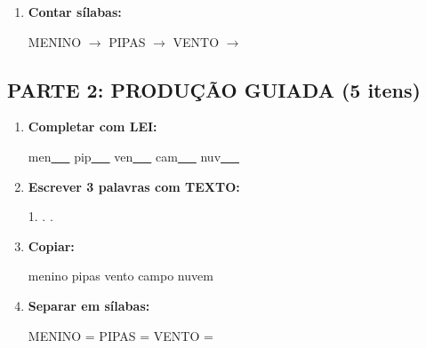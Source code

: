 \begin{exercicio}
\begin{enumerate}
  \item \textbf{Contar sílabas:}
  \begin{center}
  MENINO $\rightarrow$ \underline{\hspace{0.9cm}} \quad PIPAS $\rightarrow$ \underline{\hspace{0.9cm}} \quad VENTO $\rightarrow$ \underline{\hspace{0.9cm}}
  \end{center}

\end{enumerate}

\subsection*{PARTE 2: PRODUÇÃO GUIADA (5 itens)}

\begin{enumerate}[resume]

  \item \textbf{Completar com LEI:}
  \begin{center}
  men\underline{~~~} \quad pip\underline{~~~} \quad ven\underline{~~~} \quad cam\underline{~~~} \quad nuv\underline{~~~}
  \end{center}

  \item \textbf{Escrever 3 palavras com TEXTO:}
  \begin{center}
  1. \underline{\hspace{3cm}} . \underline{\hspace{3cm}} . \underline{\hspace{3cm}}
  \end{center}

  \item \textbf{Copiar:}
  \begin{center}
  menino \quad pipas \quad vento \quad campo \quad nuvem
  \end{center}

  \item \textbf{Separar em sílabas:}
  \begin{center}
  MENINO = \underline{\hspace{1cm}} \underline{\hspace{1cm}} \quad PIPAS = \underline{\hspace{1cm}} \underline{\hspace{1cm}} \quad VENTO = \underline{\hspace{1cm}} \underline{\hspace{1cm}}
  \end{center}


\end{enumerate}
\end{exercicio}
